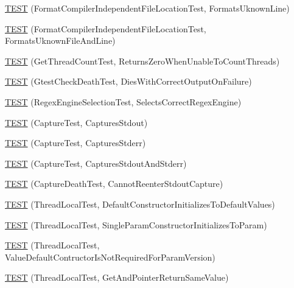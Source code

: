 \begin{DoxyCompactItemize}
\mbox{\hyperlink{namespacetesting_1_1internal_a0315a64a661f249628f2884080e0614f}{T\+E\+ST}} (Format\+Compiler\+Independent\+File\+Location\+Test, Formats\+Uknown\+Line)
\item 
\mbox{\hyperlink{namespacetesting_1_1internal_a8b9aee556f3dec6e67c35830ba55e0bd}{T\+E\+ST}} (Format\+Compiler\+Independent\+File\+Location\+Test, Formats\+Uknown\+File\+And\+Line)
\item 
\mbox{\hyperlink{namespacetesting_1_1internal_a5ad8299ae9325382f01b945f4f81711e}{T\+E\+ST}} (Get\+Thread\+Count\+Test, Returns\+Zero\+When\+Unable\+To\+Count\+Threads)
\item 
\mbox{\hyperlink{namespacetesting_1_1internal_afabff70df09a0e4fcda96dd36460c2b9}{T\+E\+ST}} (Gtest\+Check\+Death\+Test, Dies\+With\+Correct\+Output\+On\+Failure)
\item 
\mbox{\hyperlink{namespacetesting_1_1internal_a198f7132f76dd44d48dac54dc5d38fbb}{T\+E\+ST}} (Regex\+Engine\+Selection\+Test, Selects\+Correct\+Regex\+Engine)
\item 
\mbox{\hyperlink{namespacetesting_1_1internal_a0b658d88cea3a2fe6775b1b269c0204b}{T\+E\+ST}} (Capture\+Test, Captures\+Stdout)
\item 
\mbox{\hyperlink{namespacetesting_1_1internal_abbc9510a4f690912c32835213d95198f}{T\+E\+ST}} (Capture\+Test, Captures\+Stderr)
\item 
\mbox{\hyperlink{namespacetesting_1_1internal_a341ff65f3ca44b27fc51f03a9a05bee8}{T\+E\+ST}} (Capture\+Test, Captures\+Stdout\+And\+Stderr)
\item 
\mbox{\hyperlink{namespacetesting_1_1internal_a325a786fb22b87e5aa8d8f584b42ab09}{T\+E\+ST}} (Capture\+Death\+Test, Cannot\+Reenter\+Stdout\+Capture)
\item 
\mbox{\hyperlink{namespacetesting_1_1internal_af366e28e373f36480decc2ea586f48f0}{T\+E\+ST}} (Thread\+Local\+Test, Default\+Constructor\+Initializes\+To\+Default\+Values)
\item 
\mbox{\hyperlink{namespacetesting_1_1internal_a5a52dd578217050e621ebd2aace97a70}{T\+E\+ST}} (Thread\+Local\+Test, Single\+Param\+Constructor\+Initializes\+To\+Param)
\item 
\mbox{\hyperlink{namespacetesting_1_1internal_a6dffc8331590224259b60e855ad07d03}{T\+E\+ST}} (Thread\+Local\+Test, Value\+Default\+Contructor\+Is\+Not\+Required\+For\+Param\+Version)
\item 
\mbox{\hyperlink{namespacetesting_1_1internal_a0e7c2d58a313bec0821df19f44351d84}{T\+E\+ST}} (Thread\+Local\+Test, Get\+And\+Pointer\+Return\+Same\+Value)

\end{DoxyCompactItemize}
